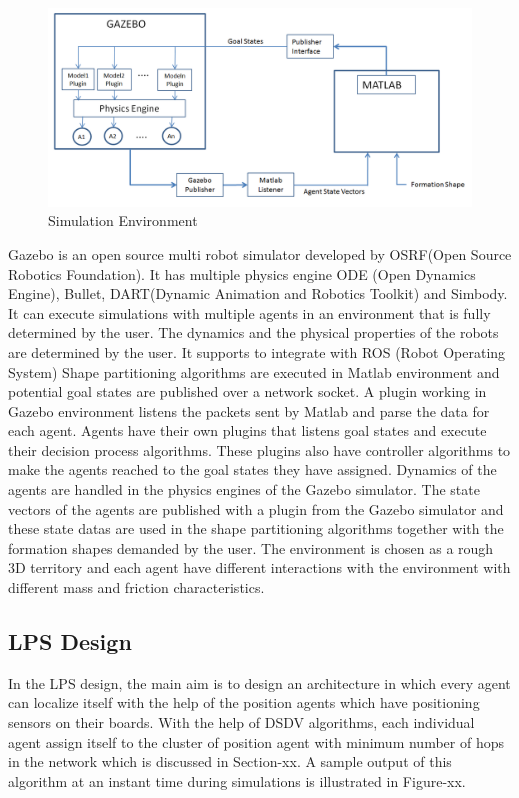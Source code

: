 \documentclass[twoside]{article}
\begin{document}
    
    	\begin{figure}[H]
    		\caption{Simulation Environment}
    		\centering
    		\includegraphics[scale = 0.50]{environment}
    	\end{figure}
    

    
	Gazebo is an open source multi robot simulator developed by OSRF(Open Source Robotics Foundation). It has multiple physics engine ODE (Open Dynamics Engine), Bullet, DART(Dynamic Animation and Robotics Toolkit) and Simbody. It can execute simulations with multiple agents in an environment that is fully determined by the user. The dynamics and the physical properties of the robots are determined by the user. It supports to integrate with ROS (Robot Operating System)
    Shape partitioning algorithms are executed in Matlab environment and  potential goal states are published over a network socket. A plugin working in Gazebo environment listens the packets sent by Matlab and parse the data for each agent. Agents have their own plugins that listens goal states and execute their decision process algorithms. These plugins also have controller algorithms to make the agents reached to the goal states they have assigned. Dynamics of the agents are handled in the physics engines of the Gazebo simulator. The state vectors of the agents are published with a plugin from the Gazebo simulator and these state datas are used in the shape partitioning algorithms together with the formation shapes demanded by the user.   The environment is chosen as a rough 3D territory and each agent have different interactions with the environment with different mass and friction characteristics.
    


	
	\subsection{LPS  Design}
In the LPS design, the main aim is to design an architecture in which every agent can localize itself with the help of the position agents which have positioning sensors on their boards. With the help of DSDV algorithms, each individual agent assign itself to the cluster of position agent with minimum number of hops in the network which is discussed in Section-xx. A sample output of this algorithm at an instant time during simulations is illustrated in Figure-xx. 
	
\end{document}

